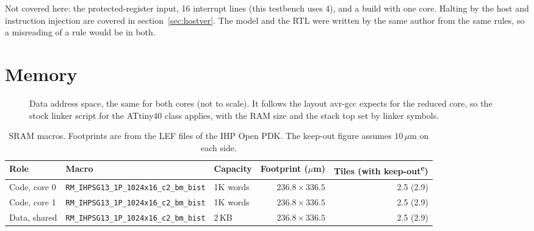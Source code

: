 \documentclass[10pt,a4paper]{article}
\newcommand{\est}{\textsuperscript{e}}
\begin{document}
Not covered here: the protected-register input, 16 interrupt lines (this testbench uses 4), and a build with one core. Halting by the host and instruction injection are covered in section~\ref{sec:hostver}. The model and the RTL were written by the same author from the
same rules, so a misreading of a rule would be in both.

\section{Memory}

\begin{figure}[!htb]
\centering
{}
\caption{Data address space, the same for both cores (not to scale). It follows the layout avr-gcc expects for
the reduced core, so the stock linker script for the ATtiny40 class applies, with the RAM size and the stack
top set by linker symbols.}
\end{figure}

\begin{table}[!htb]
\centering\small
\begin{tabular}{@{}lllrr@{}}
\toprule
Role & Macro & Capacity & Footprint ($\mu$m) & Tiles (with keep-out\est) \\
\midrule
Code, core 0 & \texttt{RM\_IHPSG13\_1P\_1024x16\_c2\_bm\_bist} & 1K words & $236.8 \times 336.5$ & 2.5 (2.9) \\
Code, core 1 & \texttt{RM\_IHPSG13\_1P\_1024x16\_c2\_bm\_bist} & 1K words & $236.8 \times 336.5$ & 2.5 (2.9) \\
Data, shared & \texttt{RM\_IHPSG13\_1P\_1024x16\_c2\_bm\_bist} & 2\,KB & $236.8 \times 336.5$ & 2.5 (2.9) \\
\bottomrule
\end{tabular}
\caption{SRAM macros. Footprints are from the LEF files of the IHP Open PDK. The keep-out figure assumes
$10\,\mu$m on each side.}
\label{tab:macros}
\end{table}
\end{document}
